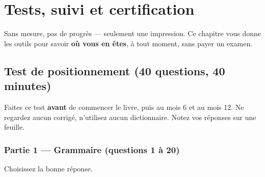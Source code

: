 \chapter{Tests, suivi et certification}

Sans mesure, pas de progrès --- seulement une impression. Ce chapitre vous donne les outils
pour savoir \textbf{où vous en êtes}, à tout moment, sans payer un examen.

\section{Test de positionnement (40 questions, 40 minutes)}
Faites ce test \textbf{avant} de commencer le livre, puis au mois 6 et au mois 12.
Ne regardez aucun corrigé, n'utilisez aucun dictionnaire. Notez vos réponses sur une feuille.

\subsection{Partie 1 --- Grammaire (questions 1 à 20)}
Choisissez la bonne réponse.

